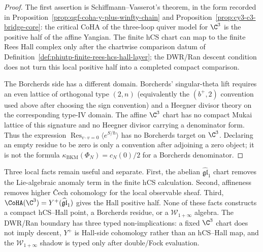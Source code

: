 \begin{proof}
The first assertion is Schiffmann--Vasserot's theorem, in the form
recorded in Proposition~\ref{prop:qgf-coha-y-plus-winfty-chain} and
Proposition~\ref{prop:cy3-c3-bridge-core}: the critical CoHA of the
three-loop quiver model for \(\C^3\) is the positive half of the
affine Yangian. The finite hCS chart can map to the finite Rees Hall
complex only after the chartwise comparison datum of
Definition~\ref{def:phiutp-finite-rees-hcs-hall-layer}; the DWR/Ran
descent condition does not turn this local positive half into a completed
compact comparison.

The Borcherds side has a different domain. Borcherds'
singular-theta lift requires an even lattice of orthogonal type
\((2,n)\) (equivalently the \((b^+,2)\) convention used above after
choosing the sign convention) and a Heegner divisor theory on the
corresponding type-IV domain. The affine \(\C^3\) chart has no compact
Mukai lattice of this signature and no Heegner divisor carrying a
denominator form. Thus the expression
\(\operatorname*{Res}_{v\cdot v=0}\langle e^{S/\hbar}\rangle\) has no
Borcherds target on \(\C^3\). Declaring an empty residue to be zero is
only a convention after adjoining a zero object; it is not the formula
\(\kappa_{\mathrm{BKM}}(\Phi_N)=c_N(0)/2\) for a Borcherds denominator.
\end{proof}

\begin{remark}
\label{rem:phiutp-c3-non-implications}
Three local facts remain useful and separate. First, the abelian
\(\widehat{\mathfrak{gl}}_1\) chart removes the Lie-algebraic anomaly
term in the finite hCS calculation. Second, affineness removes higher
\v{C}ech cohomology for the local observable sheaf. Third,
\(\CoHA(\C^3)=Y^+(\widehat{\mathfrak{gl}}_1)\) gives the Hall positive
half. None of these facts constructs a compact hCS--Hall point, a
Borcherds residue, or a \(\mathcal W_{1+\infty}\) algebra. The DWR/Ran
boundary has three typed non-implications: a fixed \(\C^3\) chart does
not imply descent, \(Y^+\) is Hall-side cohomology rather than an
hCS--Hall map, and the \(\mathcal W_{1+\infty}\) shadow is typed only
after double/Fock evaluation.
\end{remark}

